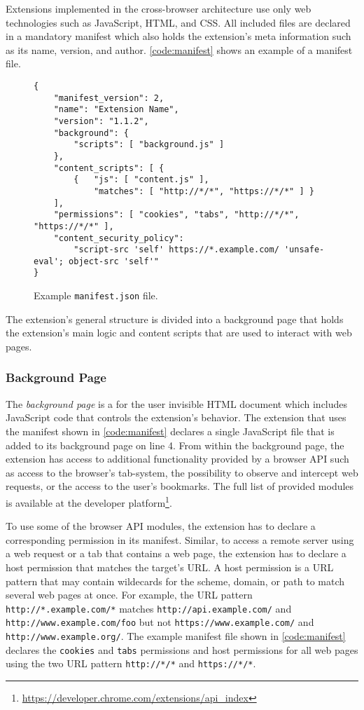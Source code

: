 	Extensions implemented in the cross-browser architecture use only web technologies such as JavaScript, HTML, and CSS. All included files are declared in a mandatory manifest which also holds the extension's meta information such as its name, version, and author. \autoref{code:manifest} shows an example of a manifest file. 
	
	\begin{figure}[h]
		\begin{lstlisting}
{
	"manifest_version": 2,
	"name": "Extension Name",
	"version": "1.1.2",
	"background": {
		"scripts": [ "background.js" ]
	},
	"content_scripts": [ {
		{ 	"js": [ "content.js" ],
			"matches": [ "http://*/*", "https://*/*" ] }
	],
	"permissions": [ "cookies", "tabs", "http://*/*", "https://*/*" ],
	"content_security_policy": 
		"script-src 'self' https://*.example.com/ 'unsafe-eval'; object-src 'self'"
}
\end{lstlisting}
		\caption{Example \texttt{manifest.json} file.}
		\label{code:manifest}
	\end{figure}
	
	The extension's general structure is divided into a background page that holds the extension's main logic and content scripts that are used to interact with web pages.
	
\subsubsection{Background Page}

	The \textit{background page} is a for the user invisible HTML document which includes JavaScript code that controls the extension's behavior. The extension that uses the manifest shown in \autoref{code:manifest} declares a single JavaScript file that is added to its background page on line 4. From within the background page, the extension has access to additional functionality provided by a browser API such as access to the browser's tab-system, the possibility to observe and intercept web requests, or the access to the user's bookmarks. The full list of provided modules is available at the developer platform\footnote{\url{https://developer.chrome.com/extensions/api_index}}. 
	
	To use some of the browser API modules, the extension has to declare a corresponding permission in its manifest. Similar, to access a remote server using a web request or a tab that contains a web page, the extension has to declare a host permission that matches the target's URL. A host permission is a URL pattern that may contain wildecards for the scheme, domain, or path to match several web pages at once. For example, the URL pattern \texttt{http://*.example.com/*} matches \texttt{http://api.example.com/} and \texttt{http://www.example.com/foo} but not \texttt{https://www.example.com/} and \texttt{http://www.example.org/}. The example manifest file shown in \autoref{code:manifest} declares the \texttt{cookies} and \texttt{tabs} permissions and host permissions for all web pages using the two URL pattern \texttt{http://*/*} and \texttt{https://*/*}.	
	
